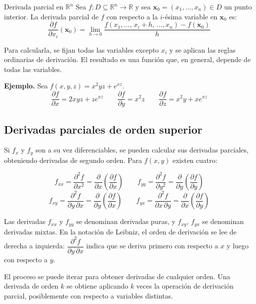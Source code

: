 \begin{mydefinition}{Derivada parcial en $\mathbb{R}^n$}
Sea $f: D \subseteq \mathbb{R}^n \to \mathbb{R}$ y sea $\mathbf{x}_0 = (x_1, \dots, x_n) \in D$ un punto interior. La derivada parcial de $f$ con respecto a la $i$-ésima variable en $\mathbf{x}_0$ es:
\[
\frac{\partial f}{\partial x_i}(\mathbf{x}_0)
= \lim_{h \to 0}
  \frac{f(x_1, \dots,\, x_i + h,\, \dots, x_n) - f(\mathbf{x}_0)}{h}
\]
\end{mydefinition}

Para calcularla, se fijan todas las variables excepto $x_i$ y se aplican las reglas ordinarias de derivación. El resultado es una función que, en general, depende de todas las variables.

\textbf{Ejemplo.} Sea $f(x, y, z) = x^2 yz + e^{xz}$.
\[
\frac{\partial f}{\partial x} = 2xyz + ze^{xz}
\qquad
\frac{\partial f}{\partial y} = x^2 z
\qquad
\frac{\partial f}{\partial z} = x^2 y + xe^{xz}
\]

\subsection{Derivadas parciales de orden superior}

Si $f_x$ y $f_y$ son a su vez diferenciables, se pueden calcular sus derivadas parciales, obteniendo derivadas de segundo orden. Para $f(x, y)$ existen cuatro:

\[
f_{xx} = \frac{\partial^2 f}{\partial x^2}
       = \frac{\partial}{\partial x}\!\left(\frac{\partial f}{\partial x}\right)
\qquad
f_{yy} = \frac{\partial^2 f}{\partial y^2}
       = \frac{\partial}{\partial y}\!\left(\frac{\partial f}{\partial y}\right)
\]
\[
f_{xy} = \frac{\partial^2 f}{\partial y\,\partial x}
       = \frac{\partial}{\partial y}\!\left(\frac{\partial f}{\partial x}\right)
\qquad
f_{yx} = \frac{\partial^2 f}{\partial x\,\partial y}
       = \frac{\partial}{\partial x}\!\left(\frac{\partial f}{\partial y}\right)
\]

Las derivadas $f_{xx}$ y $f_{yy}$ se denominan derivadas puras, y $f_{xy}$, $f_{yx}$ se denominan derivadas mixtas. En la notación de Leibniz, el orden de derivación se lee de derecha a izquierda: $\dfrac{\partial^2 f}{\partial y\,\partial x}$ indica que se deriva primero con respecto a $x$ y luego con respecto a $y$.

El proceso se puede iterar para obtener derivadas de cualquier orden. Una derivada de orden $k$ se obtiene aplicando $k$ veces la operación de derivación parcial, posiblemente con respecto a variables distintas.

